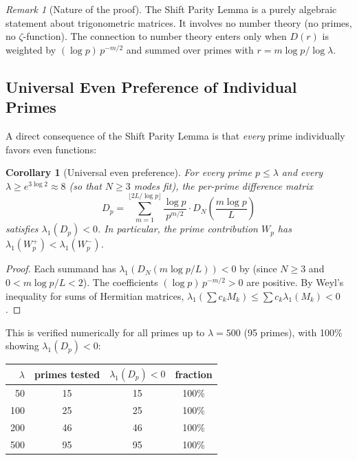 \documentclass[12pt,a4paper]{article}
\newtheorem{corollary}[theorem]{Corollary}
\theoremstyle{definition}
\theoremstyle{remark}
\newtheorem{remark}[theorem]{Remark}
\begin{document}
\begin{remark}[Nature of the proof]
The Shift Parity Lemma is a purely algebraic statement about trigonometric matrices. It involves no number theory (no primes, no $\zeta$-function). The connection to number theory enters only when $D(r)$ is weighted by $(\log p)\,p^{-m/2}$ and summed over primes with $r = m\log p / \log\lambda$.
\end{remark}

\subsection{Universal Even Preference of Individual Primes}

A direct consequence of the Shift Parity Lemma is that \emph{every} prime individually favors even functions:

\begin{corollary}[Universal even preference]
\label{cor:universal}
For every prime $p \leq \lambda$ and every $\lambda \geq e^{3\log 2} \approx 8$ (so that $N \geq 3$ modes fit), the per-prime difference matrix
\[
  D_p = \sum_{m=1}^{\lfloor 2L/\log p \rfloor} \frac{\log p}{p^{m/2}} \cdot D_N\!\left(\frac{m\log p}{L}\right)
\]
satisfies $\lambda_1(D_p) < 0$. In particular, the prime contribution $W_p$ has $\lambda_1(W_p^+) < \lambda_1(W_p^-)$.
\end{corollary}

\begin{proof}
Each summand has $\lambda_1(D_N(m\log p/L)) < 0$ by  (since $N \geq 3$ and $0 < m\log p/L < 2$). The coefficients $(\log p)\,p^{-m/2} > 0$ are positive. By Weyl's inequality for sums of Hermitian matrices, $\lambda_1(\sum c_k M_k) \leq \sum c_k \lambda_1(M_k) < 0$.
\end{proof}

This is verified numerically for all primes up to $\lambda = 500$ (95 primes), with 100\% showing $\lambda_1(D_p) < 0$:

\begin{center}
\renewcommand{\arraystretch}{1.15}
\begin{tabular}{r|c|c|c}
$\lambda$ & primes tested & $\lambda_1(D_p) < 0$ & fraction \\\hline
50 & 15 & 15 & 100\% \\
100 & 25 & 25 & 100\% \\
200 & 46 & 46 & 100\% \\
500 & 95 & 95 & 100\%
\end{tabular}
\end{center}
\end{document}
